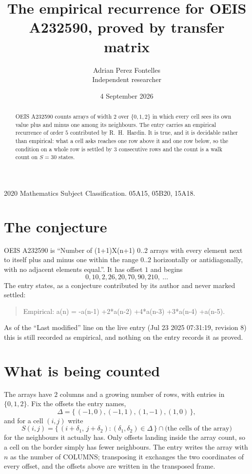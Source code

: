 \documentclass[11pt,a4paper]{article}
\title{The empirical recurrence for OEIS A232590, proved by transfer matrix}
\author{Adrian Perez Fontelles\\ \small Independent researcher}
\date{4 September 2026}
\theoremstyle{plain}
\theoremstyle{definition}
\begin{document}
\maketitle

\begin{abstract}
OEIS A232590 counts arrays of width $2$ over $\{0,1,2\}$ in which every cell sees its own value plus and minus one among its neighbours. The entry carries an
empirical recurrence of order $5$ contributed by R.~H.~Hardin. It is true, and it is
decidable rather than empirical: what a cell asks reaches one row above it and one row below, so the
condition on a whole row is settled by $3$ consecutive rows and the count is a walk
count on $S=30$ states.
\end{abstract}

\noindent\small 2020 Mathematics Subject Classification. 05A15, 05B20, 15A18.\normalsize

\section{The conjecture}

OEIS A232590 is ``Number of (1+1)X(n+1) 0..2 arrays with every element next to itself plus and minus one within the range 0..2 horizontally or antidiagonally, with no adjacent elements equal.''. It has offset $1$ and begins
\[
0, 10, 2, 26, 20, 70, 90, 210,\ \dots
\]
The entry states, as a conjecture contributed by its author and never marked settled:
\begin{quote}
Empirical: a(n) = -a(n-1) +2*a(n-2) +4*a(n-3) +3*a(n-4) +a(n-5).
\end{quote}
As of the ``Last modified'' line on the live entry (Jul 23 2025 07:31:19, revision 8) this is still
recorded as empirical, and nothing on the entry records it as proved.

\section{What is being counted}

The arrays have $2$ columns and a growing number of rows, with entries in $\{0,1,2\}$. Fix the
offsets the entry names,
\[
\Delta=\{\,(-1,0), (-1,1), (1,-1), (1,0)\,\},
\]
and for a cell $(i,j)$ write
\[
S(i,j)=\{\,(i+\delta_1,\,j+\delta_2) : (\delta_1,\delta_2)\in\Delta\,\}\cap
\text{(the cells of the array)}
\]
for the neighbours it actually has. Only offsets landing inside the array count, so a cell on
the border simply has fewer neighbours. The entry writes the array with $n$ as the number of COLUMNS; transposing it exchanges the two coordinates of every offset, and the offsets above are written in the transposed frame.
\end{document}
